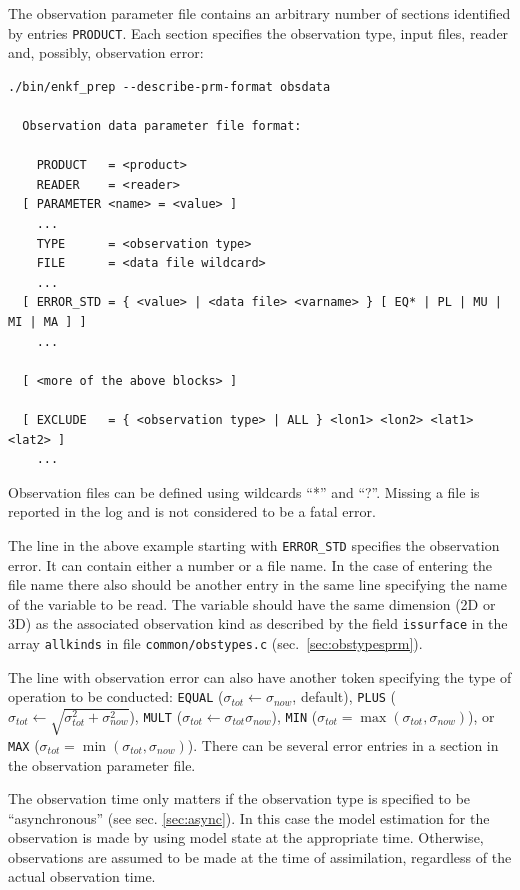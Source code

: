 \documentclass[11pt]{report}
\begin{document}
The observation parameter file contains an arbitrary number of sections identified by entries \verb|PRODUCT|.
Each section specifies the observation type, input files, reader and, possibly, observation error:
\begin{Verbatim}[frame=single,fontsize=\footnotesize]
./bin/enkf_prep --describe-prm-format obsdata

  Observation data parameter file format:

    PRODUCT   = <product>
    READER    = <reader>
  [ PARAMETER <name> = <value> ]
    ...
    TYPE      = <observation type>
    FILE      = <data file wildcard> 
    ...
  [ ERROR_STD = { <value> | <data file> <varname> } [ EQ* | PL | MU | MI | MA ] ]
    ...

  [ <more of the above blocks> ]

  [ EXCLUDE   = { <observation type> | ALL } <lon1> <lon2> <lat1> <lat2> ]
    ...
\end{Verbatim}
Observation files can be defined using wildcards ``*'' and ``?''.
Missing a file is reported in the log and is not considered to be a fatal error.

The line in the above example starting with \verb|ERROR_STD| specifies the observation error.
It can contain either a number or a file name.
In the case of entering the file name there also should be another entry in the same line specifying the name of the variable to be read.
The variable should have the same dimension (2D or 3D) as the associated observation kind as described by the field \verb|issurface| in the array \verb|allkinds| in file \verb|common/obstypes.c| (sec.~\ref{sec:obstypesprm}).

The line with observation error can also have another token specifying the type of operation to be conducted: \verb|EQUAL| ($\sigma_{tot} \leftarrow \sigma_{now}$, default), \verb|PLUS| ($\sigma_{tot} \leftarrow \sqrt{\sigma_{tot}^2 + \sigma_{now}^2}$), \verb|MULT| ($\sigma_{tot} \leftarrow \sigma_{tot} \sigma_{now}$), \verb|MIN| ($\sigma_{tot} = \max(\sigma_{tot}, \sigma_{now})$), or \verb|MAX| ($\sigma_{tot} = \min(\sigma_{tot}, \sigma_{now})$).
There can be several error entries in a section in the observation parameter file.

The observation time only matters if the observation type is specified to be ``asynchronous'' (see sec. \ref{sec:async}).
In this case the model estimation for the observation is made by using model state at the appropriate time.
Otherwise, observations are assumed to be made at the time of assimilation, regardless of the actual observation time.
\end{document}
